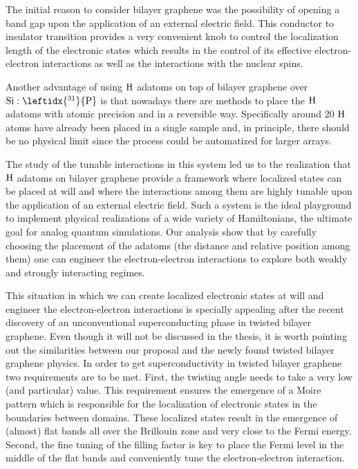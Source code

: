 
The initial reason to consider bilayer graphene was the possibility of opening a band gap upon the application of an external electric field\cite{McCann2006, Castro2007, Oostinga2007, Zhang2009, Taychatanapat2010, Castro2010a, Ponomarenko2011, Allen2012, Sui2015}.
This conductor to insulator transition provides a very convenient knob to control the localization length of the electronic states which results in the control of its effective electron-electron interactions as well as the interactions with the nuclear spins.

Another advantage of using $\ce{H}$ adatoms on top of bilayer graphene over $\ce{Si}:\leftidx{^{31}}{\ce{P}}$ is that nowadays there are methods to place the $\ce{H}$ adatoms with atomic precision and in a reversible way\cite{elias2009,Brihuega2016,Brihuega2017}. Specifically around 20 $\ce{H}$ atoms have already been placed in a single sample and, in principle, there should be no physical limit since the process could be automatized for larger arrays.
\medskip

The study of the tunable interactions in this system led us to the realization that $\ce{H}$ adatoms on bilayer graphene provide a framework where localized states can be placed at will and where the interactions among them are highly tunable upon the application of an external electric field.
Such a system is the ideal playground to implement physical realizations of a wide variety of Hamiltonians, the ultimate goal for analog quantum simulations.
Our analysis show that by carefully choosing the placement of the adatoms (the distance and relative position among them) one can engineer the electron-electron interactions to explore both weakly and strongly interacting regimes.
\bigskip

This situation in which we can create localized electronic states at will and engineer the electron-electron interactions is specially appealing after the recent discovery of an unconventional superconducting phase in twisted bilayer graphene\cite{Cao2018,Cao2018a}.
Even though it will not be discussed in the thesis, it is worth pointing out the similarities between our proposal and the newly found twisted bilayer graphene physics.
In order to get superconductivity in twisted bilayer graphene two requirements are to be met. First, the twisting angle needs to take a very low (and particular) value. This requirement ensures the emergence of a Moire pattern which is responsible for the localization of electronic states in the boundaries between domains. These localized states result in the emergence of (almost) flat bands all over the Brillouin zone and very close to the Fermi energy. Second, the fine tuning of the filling factor is key to place the Fermi level in the middle of the flat bands and conveniently tune the electron-electron interaction.

